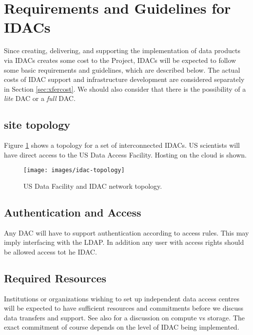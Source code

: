 \section{Requirements and Guidelines for IDACs}\label{sec:reqs}
Since creating, delivering, and supporting the implementation of \RO data products via IDACs creates some cost to the \RO Project, IDACs will be expected to follow some basic requirements and guidelines, which are described below.
The actual costs of \gls{IDAC} support and infrastructure development are considered separately in Section \ref{sec:xfercost}.
We should also consider that there is the possibility of a {\it lite} DAC or a {\it full} DAC.


\subsection{\RO site topology} \label{sec:topology}

Figure \ref{fig:idac-topology} shows a  topology for a set of interconnected IDACs.  \gls{US} scientists will have direct access to the \RO \gls{US} Data Access Facility.  Hosting on the cloud is shown.

\begin{figure}
\begin{center}
\texttt{[image: images/idac-topology]}
\caption{US Data Facility and \gls{IDAC} network topology.  \label{fig:idac-topology}}
\end{center}
\end{figure}

\subsection{Authentication and Access}\label{sec:auth}
Any DAC will have to support authentication according to \RO access rules. This may imply interfacing with the \RO LDAP. In addition any user with access rights should be allowed access tot he IDAC.

\subsection{Required Resources} \label{sec:resources}
Institutions or organizations wishing to set up independent data access centres will be expected to have
sufficient resources and commitments before we discuss data transfers and support.
See also  for a discussion on compute vs storage.
The exact commitment of course depends on the level of IDAC being implemented.

